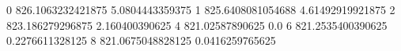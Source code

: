 0 826.1063232421875 5.0804443359375
1 825.6408081054688 4.61492919921875
2 823.186279296875 2.160400390625
4 821.02587890625 0.0
6 821.2535400390625 0.2276611328125
8 821.0675048828125 0.0416259765625
